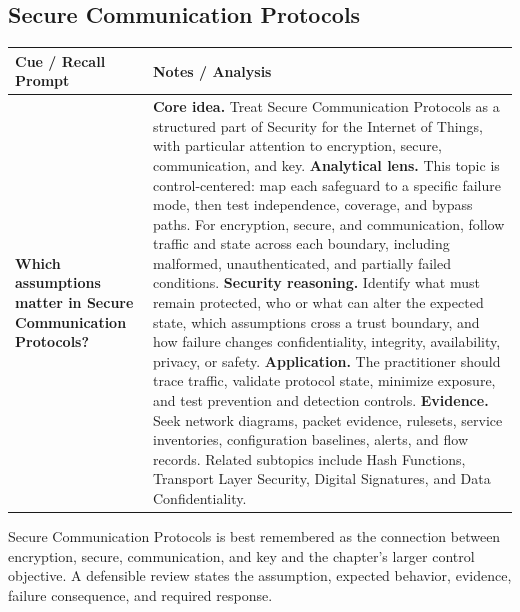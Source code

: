 \documentclass[11pt]{article}
\newcommand{\CornellHeader}{%
\rowcolor{Navy}\color{white}\bfseries Cue / Recall Prompt & \color{white}\bfseries Notes / Analysis\\\hline}
\newcommand{\CornellRow}[2]{%
\cellcolor{CueGray}\RaggedRight\textbf{#1} & \RaggedRight #2\\\hline}
\begin{document}
\subsection*{Secure Communication Protocols}
\begin{longtable}{>{\RaggedRight\arraybackslash}p{}|>{\RaggedRight\arraybackslash}p{}}
\CornellHeader
\CornellRow{Which assumptions matter in Secure Communication Protocols?}{\textbf{Core idea.} Treat Secure Communication Protocols as a structured part of Security for the Internet of Things, with particular attention to encryption, secure, communication, and key. \textbf{Analytical lens.} This topic is control-centered: map each safeguard to a specific failure mode, then test independence, coverage, and bypass paths. For encryption, secure, and communication, follow traffic and state across each boundary, including malformed, unauthenticated, and partially failed conditions. \textbf{Security reasoning.} Identify what must remain protected, who or what can alter the expected state, which assumptions cross a trust boundary, and how failure changes confidentiality, integrity, availability, privacy, or safety. \textbf{Application.} The practitioner should trace traffic, validate protocol state, minimize exposure, and test prevention and detection controls. \textbf{Evidence.} Seek network diagrams, packet evidence, rulesets, service inventories, configuration baselines, alerts, and flow records. Related subtopics include Hash Functions, Transport Layer Security, Digital Signatures, and Data Confidentiality.}
\end{longtable}
\begin{topicsummary}
Secure Communication Protocols is best remembered as the connection between encryption, secure, communication, and key and the chapter's larger control objective. A defensible review states the assumption, expected behavior, evidence, failure consequence, and required response.
\end{topicsummary}
\end{document}
